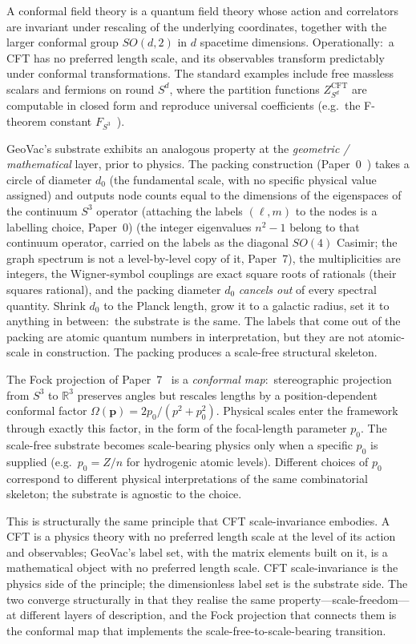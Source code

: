 \documentclass[aps,pra,twocolumn,superscriptaddress,longbibliography]{revtex4-2}
\begin{document}
A conformal field theory is a quantum field theory whose action and
correlators are invariant under rescaling of the underlying coordinates,
together with the larger conformal group $SO(d, 2)$ in $d$ spacetime
dimensions.  Operationally:\ a CFT has no preferred length scale, and
its observables transform predictably under conformal
transformations.  The standard examples include free massless scalars
and fermions on round $S^d$, where the partition functions
$Z_{S^d}^{\text{CFT}}$ are computable in closed form and reproduce
universal coefficients (e.g.\ the F-theorem constant
$F_{S^3}$~\cite{klebanov_pufu_safdi2011}).

GeoVac's substrate exhibits an analogous property at the
\emph{geometric / mathematical} layer, prior to physics.  The packing
construction (Paper~0~\cite{loutey_paper0}) takes a circle of diameter
$d_0$ (the fundamental scale, with no specific physical value
assigned) and outputs node counts equal to the dimensions of the
eigenspaces of the continuum $S^3$ operator (attaching the labels
$(\ell, m)$ to the nodes is a labelling choice, Paper~0) (the integer eigenvalues $n^2 - 1$ belong
to that continuum operator, carried on the labels as the diagonal
$SO(4)$ Casimir; the graph spectrum is not a level-by-level
copy of it, Paper~7), the
multiplicities are integers, the Wigner-symbol couplings are exact
square roots of rationals (their squares rational), and the packing
diameter $d_0$ \emph{cancels out} of every
spectral quantity.  Shrink $d_0$ to the Planck length, grow it to a
galactic radius, set it to anything in between:\ the substrate is the
same.  The labels that come out of the packing are atomic quantum
numbers in interpretation, but they are not atomic-scale in
construction.  The packing produces a scale-free structural skeleton.

The Fock projection of Paper~7~\cite{loutey_paper7} is a
\emph{conformal map}:\ stereographic projection from $S^3$ to
$\mathbb{R}^3$ preserves angles but rescales lengths by a
position-dependent conformal factor $\Omega(\mathbf{p}) = 2 p_0 /
(p^2 + p_0^2)$.  Physical scales enter the framework through exactly
this factor, in the form of the focal-length parameter $p_0$.  The
scale-free substrate becomes scale-bearing physics only when a specific
$p_0$ is supplied (e.g.\ $p_0 = Z/n$ for hydrogenic atomic levels).
Different choices of $p_0$ correspond to different physical
interpretations of the same combinatorial skeleton; the substrate is
agnostic to the choice.

This is structurally the same principle that CFT scale-invariance
embodies.  A CFT is a physics theory with no preferred length scale at
the level of its action and observables; GeoVac's label set, with the
matrix elements built on it, is a mathematical object with no preferred
length scale.  CFT scale-invariance is the physics side of the
principle; the dimensionless label set is the substrate side.
The two converge structurally in that they realise the same
property---scale-freedom---at different layers of description, and the
Fock projection that connects them is the conformal map that
implements the scale-free-to-scale-bearing transition.
\end{document}
